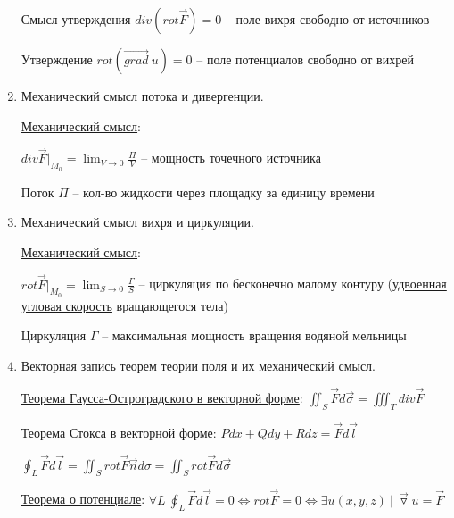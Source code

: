 \documentclass[12pt]{article}
\begin{document}
\begin{enumerate}
        Смысл утверждения $div (rot \overrightarrow F) = 0$ -- поле вихря свободно от источников

        Утверждение $rot (\overrightarrow{grad}\ u) = 0$ -- поле потенциалов свободно от вихрей


        \item Механический смысл потока и дивергенции.

        \hyperlink{divergencemechanicalmeaning}{Механический смысл}:

        $div \overrightarrow{F} \Big|_{M_0} = \lim_{V \to 0} \frac{\Pi}{V}$ -- мощность точечного источника

        Поток $\Pi$ -- кол-во жидкости через площадку за единицу времени


        \item Механический смысл вихря и циркуляции.

        \hyperlink{rotormechanicalmeaning}{Механический смысл}:

        $rot \overrightarrow{F} \Big|_{M_0} = \lim_{S \to 0} \frac{\Gamma}{S}$ -- циркуляция по бесконечно малому контуру (\hyperlink{rotormechanicalmeaning2}{удвоенная угловая скорость} вращающегося тела)

        Циркуляция $\Gamma$ -- максимальная мощность вращения водяной мельницы


        \item Векторная запись теорем теории поля и их механический смысл.

        \hyperlink{gaussostrogradskyyvector}{Теорема Гаусса-Остроградского в векторной форме}: $\iint_S \overrightarrow{F} d\overrightarrow{\sigma} = \iiint_T div \overrightarrow{F}$

        \hyperlink{theoremGaussOstrogradskyyinvectorform}{Теорема Стокса в векторной форме}: $Pdx + Qdy + Rdz = \overrightarrow{F}d\overrightarrow{l}$

        $\oint_L \overrightarrow{F}d\overrightarrow{l} = \iint_S rot \overrightarrow{F} \overrightarrow{n} d\sigma = \iint_S rot \overrightarrow{F} d\overrightarrow{\sigma}$

        \hyperlink{theoremaboutpotentialinvectorform}{Теорема о потенциале}: $\forall L \ \oint_L \overrightarrow{F}d\overrightarrow{l} = 0 \Longleftrightarrow rot \overrightarrow{F} = 0 \Longleftrightarrow \exists u(x, y, z) \ | \ \overrightarrow{\triangledown} u = \overrightarrow{F}$


    \end{enumerate}
\end{document}
